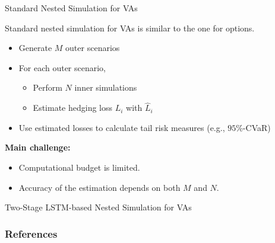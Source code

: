 \documentclass[9pt,handout]{beamer}
\begin{document}
\begin{frame}{Standard Nested Simulation for VAs}

Standard nested simulation for VAs is similar to the one for options.

\begin{itemize}
    \item Generate $M$ outer scenarios
    \item For each outer scenario,
    \begin{itemize}
        \item Perform $N$ inner simulations
        \item Estimate hedging loss $L_i$ with $\hat{L}_i$
    \end{itemize}
    \item Use estimated losses to calculate tail risk measures (e.g., $95\%$-CVaR)
\end{itemize}

\vspace{10pt}

\textbf{Main challenge:}
\begin{itemize}
    \item Computational budget is limited.
    \item Accuracy of the estimation depends on both $M$ and $N$.
\end{itemize}

\end{frame}

\begin{frame}{Two-Stage LSTM-based Nested Simulation for VAs}

\end{frame}

\begin{frame}
    \frametitle{References}
    
    
\end{frame}
\end{document}
